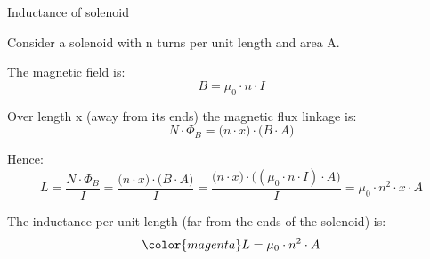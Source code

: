 \begin{frame}{Inductance of solenoid}

Consider a solenoid with n turns per unit length and area A.\\
\vspace{0.2cm}

The magnetic field is:
\begin{equation*}
    B = \mu_0 \cdot n \cdot  I
\end{equation*}

Over length x (away from its ends) the magnetic flux linkage is:
\begin{equation*}
    N \cdot \Phi_B = \Big( n \cdot  x \Big) \cdot \Big( B \cdot A \Big)
\end{equation*}

Hence:
\begin{equation*}
  L =
      \frac{N \cdot \Phi_B}{I} =
      \frac{\Big( n \cdot  x \Big) \cdot \Big( B \cdot A \Big)}{I} =
      \frac{\Big( n \cdot  x \Big) \cdot \Big( (\mu_0 \cdot n \cdot  I) \cdot A \Big)}{I} =
      \mu_0 \cdot n^2 \cdot x \cdot A
\end{equation*}

The inductance per unit length (far from the ends of the solenoid) is:
\begin{equation*}
{\color{magenta}
  L =  \mu_0 \cdot n^2 \cdot A
}
\end{equation*}

\end{frame}

%
%
%


